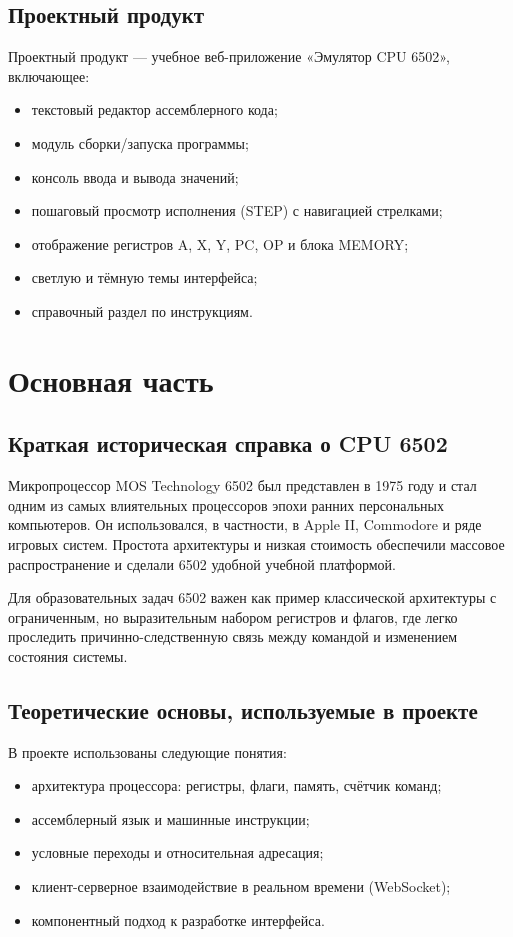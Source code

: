 \documentclass[12pt,a4paper]{article}
\begin{document}
\subsection{Проектный продукт}
Проектный продукт --- учебное веб-приложение «Эмулятор CPU 6502», включающее:
\begin{itemize}
  \item текстовый редактор ассемблерного кода;
  \item модуль сборки/запуска программы;
  \item консоль ввода и вывода значений;
  \item пошаговый просмотр исполнения (STEP) с навигацией стрелками;
  \item отображение регистров A, X, Y, PC, OP и блока MEMORY;
  \item светлую и тёмную темы интерфейса;
  \item справочный раздел по инструкциям.
\end{itemize}

\section{Основная часть}

\subsection{Краткая историческая справка о CPU 6502}
Микропроцессор MOS Technology 6502 был представлен в 1975 году и стал одним из самых влиятельных процессоров эпохи ранних персональных компьютеров. Он использовался, в частности, в Apple II, Commodore и ряде игровых систем. Простота архитектуры и низкая стоимость обеспечили массовое распространение и сделали 6502 удобной учебной платформой.

Для образовательных задач 6502 важен как пример классической архитектуры с ограниченным, но выразительным набором регистров и флагов, где легко проследить причинно-следственную связь между командой и изменением состояния системы.

\subsection{Теоретические основы, используемые в проекте}
В проекте использованы следующие понятия:
\begin{itemize}
  \item архитектура процессора: регистры, флаги, память, счётчик команд;
  \item ассемблерный язык и машинные инструкции;
  \item условные переходы и относительная адресация;
  \item клиент-серверное взаимодействие в реальном времени (WebSocket);
  \item компонентный подход к разработке интерфейса.
\end{itemize}
\end{document}

